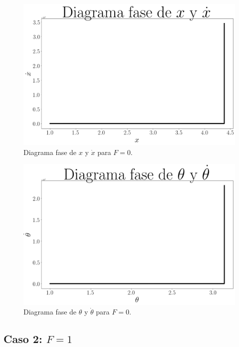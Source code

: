 \documentclass[12pt,letterpaper]{article}
\begin{document}
\begin{figure}[h]
 \centering
 \includegraphics[scale=0.2]{img/sp_phase_x_dx_f0.png}
 \caption{Diagrama fase de $x$ y $\dot{x}$ para $F=0$.}
 \label{fig: sp phase x dx force 0}
\end{figure}

\begin{figure}[h]
 \centering
 \includegraphics[scale=0.2]{img/sp_phase_theta_dtheta_f0.png}
\caption{Diagrama fase de $\theta$ y $\dot{\theta}$ para $F=0$.}
 \label{fig: sp phase theta dtheta force 0}
\end{figure}

\pagebreak

\subsection{Caso 2: $F=1$}
\end{document}
